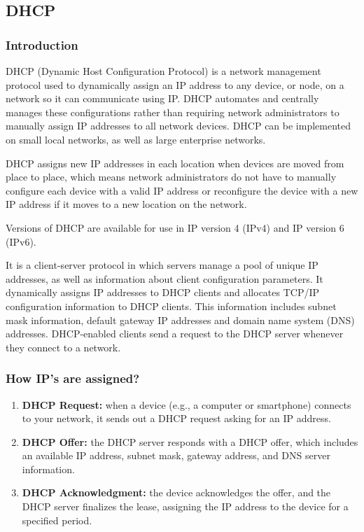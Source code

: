 \documentclass{article}
\begin{document}
\subsection{DHCP}

\subsubsection{Introduction}

DHCP (Dynamic Host Configuration Protocol) is a network management protocol used to dynamically assign an IP address to any device, or node, on a network so it can communicate using IP. DHCP automates and centrally manages these configurations rather than requiring network administrators to manually assign IP addresses to all network devices. DHCP can be implemented on small local networks, as well as large enterprise networks.

DHCP assigns new IP addresses in each location when devices are moved from place to place, which means network administrators do not have to manually configure each device with a valid IP address or reconfigure the device with a new IP address if it moves to a new location on the network.

Versions of DHCP are available for use in IP version 4 (IPv4) and IP version 6 (IPv6).

It is a client-server protocol in which servers manage a pool of unique IP addresses, as well as information about client configuration parameters.  It dynamically assigns IP addresses to DHCP clients and allocates TCP/IP configuration information to DHCP clients. This information includes subnet mask information, default gateway IP addresses and domain name system (DNS) addresses. DHCP-enabled clients send a request to the DHCP server whenever they connect to a network.

\subsubsection{How IP's are assigned?}

\begin{enumerate}
    \item \textbf{DHCP Request:} when a device (e.g., a computer or smartphone) connects to your network, it sends out a DHCP request asking for an IP address.
    \item \textbf{DHCP Offer:} the DHCP server responds with a DHCP offer, which includes an available IP address, subnet mask, gateway address, and DNS server information.
    \item \textbf{DHCP Acknowledgment:} the device acknowledges the offer, and the DHCP server finalizes the lease, assigning the IP address to the device for a specified period.
\end{enumerate}
\end{document}
